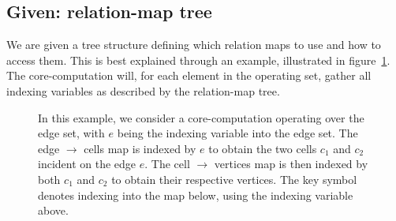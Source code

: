 \subsection{Given: relation-map tree}
We are given a tree structure defining which relation maps to use and how to access them. This is best explained through an example, illustrated in figure~\ref{fig:relation-tree}. The core-computation will, for each element in the operating set, gather all indexing variables as described by the relation-map tree.


\begin{figure}
    \newcommand{\keyicon}{}

    \caption{
    In this example, we consider a core-computation operating over the edge set, with $e$ being the indexing variable into the edge set.
    The edge $\rightarrow$ cells map is indexed by $e$ to obtain the two cells $c_1$ and $c_2$ incident on the edge $e$. The cell $\rightarrow$ vertices map is then indexed by both $c_1$ and $c_2$ to obtain their respective vertices. The key symbol denotes indexing into the map below, using the indexing variable above.
    }
    \label{fig:relation-tree}
\end{figure}


